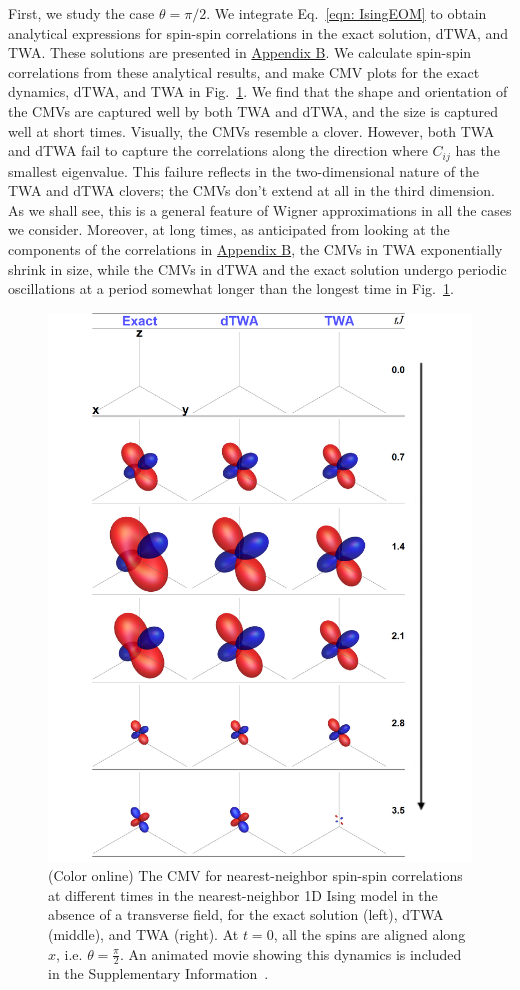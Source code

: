\documentclass[pra,reprint,superscriptaddress]{revtex4-1}
\begin{document}
First, we study the case $\theta=\pi/2$. We integrate Eq.~\eqref{eqn: IsingEOM} to obtain analytical expressions for spin-spin correlations in the exact solution, dTWA, and TWA. These solutions are presented in \hyperref[sec: analytical_expns]{Appendix B}. We calculate spin-spin correlations from these analytical results, and make CMV plots for the exact dynamics, dTWA, and TWA in Fig.~\ref{fig: Isingpi2}. We find that the shape and orientation of the CMVs are captured well by both TWA and dTWA, and the size is captured well at short times. Visually, the CMVs resemble a clover. However, both TWA and dTWA fail to capture the correlations along the direction where $C_{ij}$ has the smallest eigenvalue. This failure reflects in the two-dimensional nature of the TWA and dTWA clovers; the CMVs don't extend at all in the third dimension. As we shall see, this is a general feature of Wigner approximations in all the cases we consider. Moreover, at long times, as anticipated from looking at the components of the correlations in \hyperref[sec: analytical_expns]{Appendix B}, the CMVs in TWA exponentially shrink in size, while the CMVs in dTWA and the exact solution undergo periodic oscillations at a period somewhat longer than the longest time in Fig.~\ref{fig: Isingpi2}.
\begin{figure}[t]\centering
 \includegraphics[width = 0.9\columnwidth]{Isingpi2modified2.pdf}
 \caption{(Color online) The CMV for nearest-neighbor spin-spin correlations at different times in the nearest-neighbor 1D Ising model in the absence of a transverse field, for the exact solution (left), dTWA (middle), and TWA (right). At $t=0$, all the spins are aligned along $\hat x$, i.e. $\theta = \frac{\pi}{2}$. An animated movie showing this dynamics is included in the Supplementary Information~\cite{supplement}.}
 \label{fig: Isingpi2}
\end{figure}
\end{document}
